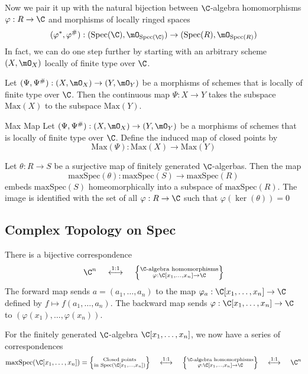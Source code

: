 \documentclass[a4paper]{article}
\begin{document}
Now we pair it up with the natural bijection between $\C$-algebra homomorphisms $\varphi:R\to\C$ and morphisms of locally ringed spaces $$(\varphi^\ast,\varphi^\#):(\text{Spec}(\C),\mO_{\text{Spec}(\C)})\to(\text{Spec}(R),\mO_{\text{Spec}(R)})$$ In fact, we can do one step further by starting with an arbitrary scheme $(X,\mO_X)$ locally of finite type over $\C$. 

\begin{prp}{}{} 
\end{prp}

\begin{prp}{}{} Let $(\Psi,\Psi^\#):(X,\mO_X)\to(Y,\mO_Y)$ be a morphisms of schemes that is locally of finite type over $\C$. Then the continuous map $\Psi:X\to Y$ takes the subspace $\text{Max}(X)$ to the subspace $\text{Max}(Y)$. 
\end{prp}

\begin{defn}{Max Map}{} Let $(\Psi,\Psi^\#):(X,\mO_X)\to(Y,\mO_Y)$ be a morphisms of schemes that is locally of finite type over $\C$. Define the induced map of closed points by $$\text{Max}(\Psi):\text{Max}(X)\to\text{Max}(Y)$$
\end{defn}

\begin{prp}{}{} Let $\theta:R\to S$ be a surjective map of finitely generated $\C$-algerbas. Then the map $$\text{maxSpec}(\theta):\text{maxSpec}(S)\to\text{maxSpec}(R)$$ embeds $\text{maxSpec}(S)$ homeomorphically into a subspace of $\text{maxSpec}(R)$. The image is identified with the set of all $\varphi:R\to\C$ such that $\varphi(\ker(\theta))=0$
\end{prp}

\subsection{Complex Topology on Spec}
\begin{lmm}{}{} There is a bijective correspondence $$\C^n\;\;\;\;\overset{1:1}{\longleftrightarrow}\;\;\;\;\left\{\substack{\C\text{-algebra homomorphisms}\\\varphi:\C[x_1,\dots,x_n]\to\C}\right\}$$ The forward map sends $a=(a_1,\dots,a_n)$ to the map $\varphi_a:\C[x_1,\dots,x_n]\to\C$ defined by $f\mapsto f(a_1,\dots,a_n)$. The backward map sends $\varphi:\C[x_1,\dots,x_n]\to\C$ to $(\varphi(x_1),\dots,\varphi(x_n))$. 
\end{lmm}

For the finitely generated $\C$-algebra $\C[x_1,\dots,x_n]$, we now have a series of correspondences $$\text{maxSpec}(\C[x_1,\dots,x_n])=\left\{\substack{\text{Closed points}\\\text{in Spec}(\C[x_1,\dots,x_n])}\right\}\;\;\;\;\overset{1:1}{\longleftrightarrow}\;\;\;\;\left\{\substack{\C\text{-algebra homomorphisms}\\\varphi:\C[x_1,\dots,x_n]\to\C}\right\}\;\;\;\;\overset{1:1}{\longleftrightarrow}\;\;\;\;\C^n$$
\end{document}
